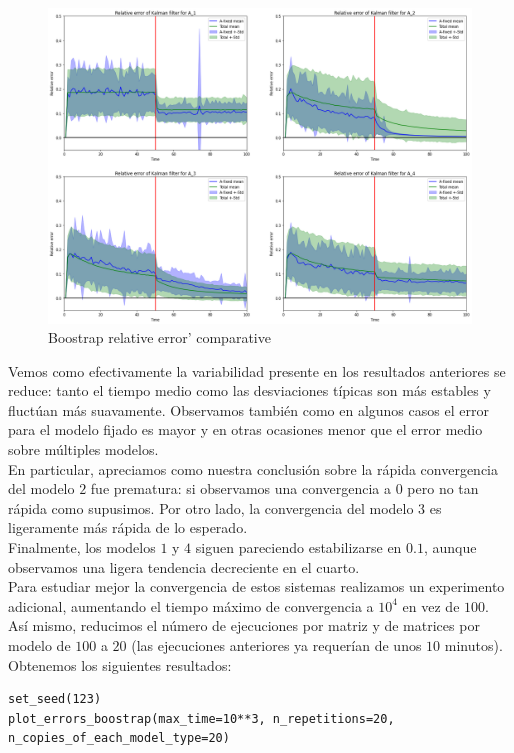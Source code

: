\documentclass[a4paper]{article}
\begin{document}
\begin{figure}[H]
	\includegraphics[scale=.6]{figures/kalman2}
	\centering
	\caption{Boostrap relative error' comparative}
\end{figure}

Vemos como efectivamente la variabilidad presente en los resultados anteriores se reduce: tanto el tiempo medio como las desviaciones típicas son más estables y fluctúan más suavamente. Observamos también como en algunos casos el error para el modelo fijado es mayor y en otras ocasiones menor que el error medio sobre múltiples modelos. \\

En particular, apreciamos como nuestra conclusión sobre la rápida convergencia del modelo $2$ fue prematura: si observamos una convergencia a $0$ pero no tan rápida como supusimos. Por otro lado, la convergencia del modelo $3$ es ligeramente más rápida de lo esperado. \\

Finalmente, los modelos $1$ y $4$ siguen pareciendo estabilizarse en $0.1$, aunque observamos una ligera tendencia decreciente en el cuarto. \\

Para estudiar mejor la convergencia de estos sistemas realizamos un experimento adicional, aumentando el tiempo máximo de convergencia a $10^4$ en vez de $100$. Así mismo, reducimos el número de ejecuciones por matriz y de matrices por modelo de $100$ a $20$ (las ejecuciones anteriores ya requerían de unos $10$ minutos). Obtenemos los siguientes resultados:

\begin{verbatim}
set_seed(123)
plot_errors_boostrap(max_time=10**3, n_repetitions=20, n_copies_of_each_model_type=20)
\end{verbatim}
\end{document}
